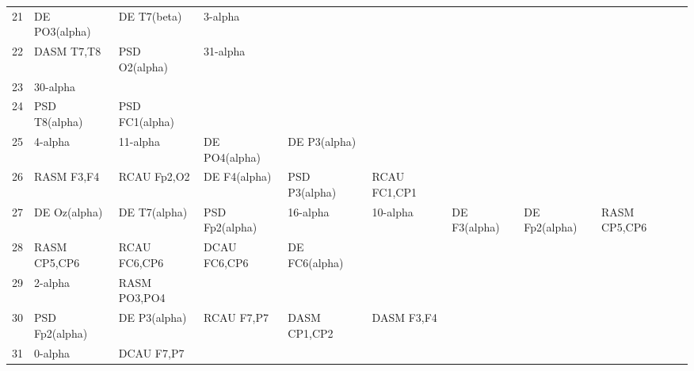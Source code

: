 \begin{landscape}
\begin{table}[]
\begin{tabular}{l|llllllll}
21       & DE PO3(alpha)  & DE T7(beta)    & 3-alpha        &                &                &                &                &                &               &              \\
22       & DASM T7,T8     & PSD O2(alpha)  & 31-alpha       &                &                &                &                &                &               &              \\
23       & 30-alpha       &                &                &                &                &                &                &                &               &              \\
24       & PSD T8(alpha)  & PSD FC1(alpha) &                &                &                &                &                &                &               &              \\
25       & 4-alpha        & 11-alpha       & DE PO4(alpha)  & DE P3(alpha)   &                &                &                &                &               &              \\
26       & RASM F3,F4     & RCAU Fp2,O2    & DE F4(alpha)   & PSD P3(alpha)  & RCAU FC1,CP1   &                &                &                &               &              \\
27       & DE Oz(alpha)   & DE T7(alpha)   & PSD Fp2(alpha) & 16-alpha       & 10-alpha       & DE F3(alpha)   & DE Fp2(alpha)  & RASM CP5,CP6   &               &              \\
28       & RASM CP5,CP6   & RCAU FC6,CP6   & DCAU FC6,CP6   & DE FC6(alpha)  &                &                &                &                &               &              \\
29       & 2-alpha        & RASM PO3,PO4   &                &                &                &                &                &                &               &              \\
30       & PSD Fp2(alpha) & DE P3(alpha)   & RCAU F7,P7     & DASM CP1,CP2   & DASM F3,F4     &                &                &                &               &              \\
31       & 0-alpha        & DCAU F7,P7     &                &                &                &                &                &                &               &              \\
\end{tabular}
\end{table}
\end{landscape}
\clearpage
